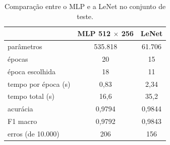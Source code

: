 \begin{table}[!t]
\centering
\caption{Comparação entre o MLP e a LeNet no conjunto de teste.}
\label{tab:comparacao}
\begin{tabular}{lcc}
\hline
 & MLP 512 $\times$ 256 & LeNet \\
\hline
parâmetros & 535.818 & 61.706 \\
épocas & 20 & 15 \\
época escolhida & 18 & 11 \\
tempo por época (s) & 0,83 & 2,34 \\
tempo total (s) & 16,6 & 35,2 \\
acurácia & 0,9794 & 0,9844 \\
F1 macro & 0,9792 & 0,9843 \\
erros (de 10.000) & 206 & 156 \\
\hline
\end{tabular}
\end{table}